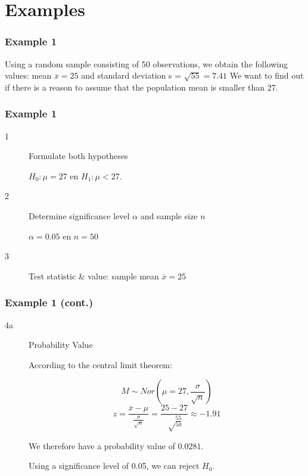 \documentclass[aspectratio=169]{beamer}
\begin{document}
\section{Examples}

\begin{frame}
  \frametitle{Example 1}
  Using a random sample consisting of 50 observations, we obtain the following values: mean $\overline{x} = 25$ and standard deviation s = $\sqrt{55} = 7.41$
  We want to find out if there is a reason to assume that the population mean is smaller than 27.
  
\end{frame}

\begin{frame}
  \frametitle{Example 1}
  
  \begin{description}
    \item[1] Formulate both hypotheses
    
    $H_{0} : \mu = 27$ en $H_{1}: \mu < 27$.
    
    \item[2] Determine significance level $\alpha$ and sample size $n$
    
    $\alpha = 0.05$ en $n=50$
    
    \item[3] Test statistic \& value: sample mean $\overline{x} = 25$
    
    
  \end{description}
\end{frame}

\begin{frame}
  \frametitle{Example 1 (cont.)}
  
  \begin{description}
    \item[4a] Probability Value
    
    According to the central limit theorem:
    
    \[ M \sim Nor(\mu = 27, \frac{\sigma}{\sqrt{n}}) \]
    \[ z = \frac{\overline{x} - \mu}{\frac{\sigma}{\sqrt{n}}} = \frac{25-27}{\sqrt\frac{55}{50}} \approx -1.91\]
    
    We therefore have a probability value of $0.0281$.
    
    Using a significance level of 0.05, we can reject $H_{0}$.
  \end{description}
  
\end{frame}
\end{document}
